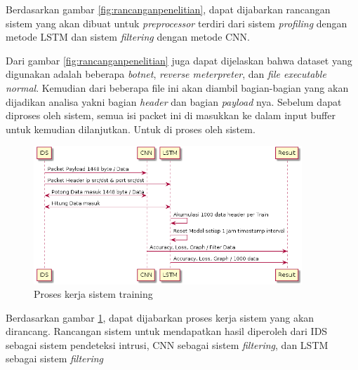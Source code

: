 \documentclass[./skripsi.tex]{subfiles}
\begin{document}
\par Berdasarkan gambar \ref{fig:rancanganpenelitian}, dapat dijabarkan rancangan sistem yang akan dibuat untuk \textit{preprocessor} terdiri dari sistem \textit{profiling} dengan metode LSTM dan sistem \textit{filtering} dengan metode CNN.

\par Dari gambar \ref{fig:rancanganpenelitian} juga dapat dijelaskan bahwa dataset yang digunakan adalah beberapa \textit{botnet}, \textit{reverse meterpreter}, dan \textit{file executable normal}. Kemudian dari beberapa file ini akan diambil bagian-bagian yang akan dijadikan analisa yakni bagian \textit{header} dan bagian \textit{payload} nya. Sebelum dapat diproses oleh sistem, semua isi packet ini di masukkan ke dalam input buffer untuk kemudian dilanjutkan. Untuk di proses oleh sistem.

\begin{figure}%
    \centering
    \includegraphics[width=0.9\textwidth]{public/assets/img/sistemtransaksicnnlstm.png}
    \caption{Proses kerja sistem training}
    \label{fig:proseskerjasistem}
\end{figure}

\par Berdasarkan gambar \ref{fig:proseskerjasistem}, dapat dijabarkan proses kerja sistem yang akan dirancang. Rancangan sistem untuk mendapatkan hasil diperoleh dari IDS sebagai sistem pendeteksi intrusi, CNN sebagai sistem \textit{filtering}, dan LSTM sebagai sistem \textit{filtering}
\end{document}
